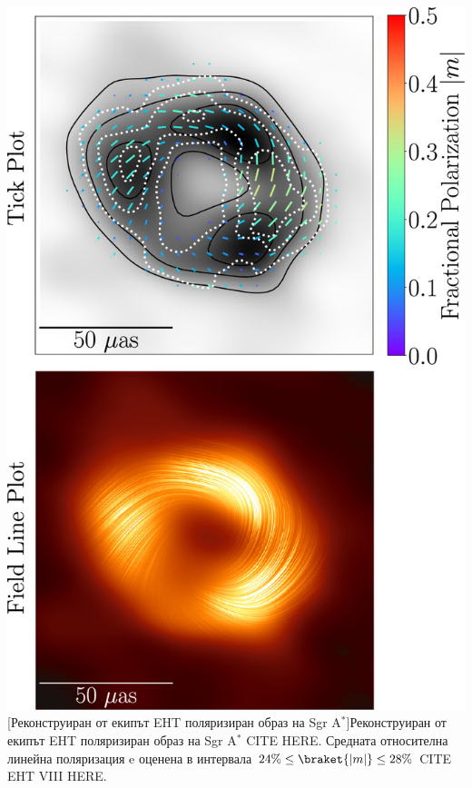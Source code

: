\begin{minipage}{15em}
	\centering
	\includegraphics[scale = 0.5]{Sgr_A_Polarization_overlay.jpg}
	[Реконструиран от екипът EHT поляризиран образ на Sgr A$^*$]{\small Реконструиран от екипът EHT поляризиран образ на Sgr A$^*$ CITE HERE. Средната относителна линейна поляризация e оценена в интервала $24\% \le \braket{|m|} \le 28\%$ CITE EHT VIII HERE.}
	\label{SgrA_Pol_Image}
\end{minipage}\\

